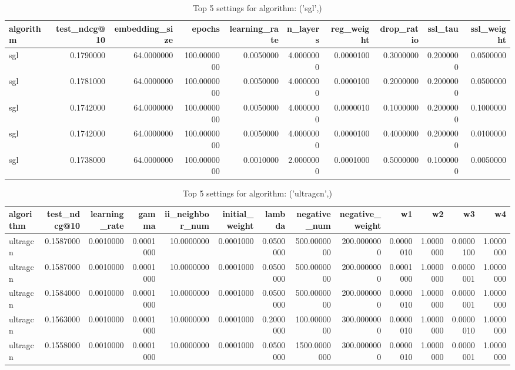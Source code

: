 \begin{table}
\caption{Top 5 settings for algorithm: ('sgl',)}
\label{tab:('sgl',)_top5}
\begin{tabular}{lrrrrrrrrr}
\toprule
algorithm & test_ndcg@10 & embedding_size & epochs & learning_rate & n_layers & reg_weight & drop_ratio & ssl_tau & ssl_weight \\
\midrule
sgl & 0.1790000 & 64.0000000 & 100.0000000 & 0.0050000 & 4.0000000 & 0.0000100 & 0.3000000 & 0.2000000 & 0.0500000 \\
sgl & 0.1781000 & 64.0000000 & 100.0000000 & 0.0050000 & 4.0000000 & 0.0000100 & 0.2000000 & 0.2000000 & 0.0500000 \\
sgl & 0.1742000 & 64.0000000 & 100.0000000 & 0.0050000 & 4.0000000 & 0.0000010 & 0.1000000 & 0.2000000 & 0.1000000 \\
sgl & 0.1742000 & 64.0000000 & 100.0000000 & 0.0050000 & 4.0000000 & 0.0000100 & 0.4000000 & 0.2000000 & 0.0100000 \\
sgl & 0.1738000 & 64.0000000 & 100.0000000 & 0.0010000 & 2.0000000 & 0.0001000 & 0.5000000 & 0.1000000 & 0.0050000 \\
\bottomrule
\end{tabular}
\end{table}


\begin{table}
\caption{Top 5 settings for algorithm: ('ultragcn',)}
\label{tab:('ultragcn',)_top5}
\begin{tabular}{lrrrrrrrrrrrr}
\toprule
algorithm & test_ndcg@10 & learning_rate & gamma & ii_neighbor_num & initial_weight & lambda & negative_num & negative_weight & w1 & w2 & w3 & w4 \\
\midrule
ultragcn & 0.1587000 & 0.0010000 & 0.0001000 & 10.0000000 & 0.0001000 & 0.0500000 & 500.0000000 & 200.0000000 & 0.0000010 & 1.0000000 & 0.0000100 & 1.0000000 \\
ultragcn & 0.1587000 & 0.0010000 & 0.0001000 & 10.0000000 & 0.0001000 & 0.0500000 & 500.0000000 & 200.0000000 & 0.0001000 & 1.0000000 & 0.0000001 & 1.0000000 \\
ultragcn & 0.1584000 & 0.0010000 & 0.0001000 & 10.0000000 & 0.0001000 & 0.0500000 & 500.0000000 & 200.0000000 & 0.0000010 & 1.0000000 & 0.0000001 & 1.0000000 \\
ultragcn & 0.1563000 & 0.0010000 & 0.0001000 & 10.0000000 & 0.0001000 & 0.2000000 & 100.0000000 & 300.0000000 & 0.0000010 & 1.0000000 & 0.0000010 & 1.0000000 \\
ultragcn & 0.1558000 & 0.0010000 & 0.0001000 & 10.0000000 & 0.0001000 & 0.0500000 & 1500.0000000 & 300.0000000 & 0.0000010 & 1.0000000 & 0.0000001 & 1.0000000 \\
\bottomrule
\end{tabular}
\end{table}


